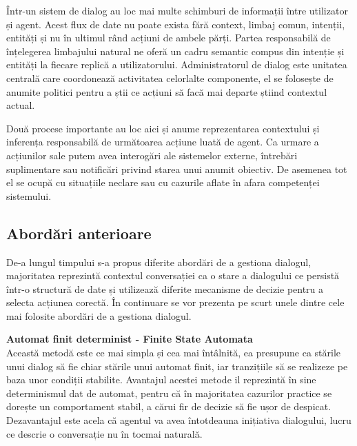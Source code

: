 Într-un sistem de dialog au loc mai multe schimburi de informații între utilizator și agent. Acest flux de date nu poate exista fără context, limbaj comun, intenții, entități și nu în ultimul rând acțiuni de ambele părți. Partea responsabilă de înțelegerea limbajului natural ne oferă un cadru semantic compus din intenție și entități la fiecare replică a utilizatorului. Administratorul de dialog este unitatea centrală care coordonează activitatea celorlalte componente, el se folosește de anumite politici pentru a știi ce acțiuni să facă mai departe știind contextul actual.

Două procese importante au loc aici și anume reprezentarea contextului și inferența responsabilă de următoarea acțiune luată de agent.
Ca urmare a acțiunilor sale putem avea interogări ale sistemelor externe, întrebări suplimentare sau notificări privind starea unui anumit obiectiv.
De asemenea tot el se ocupă cu situațiile neclare sau cu cazurile aflate în afara competenței sistemului.

\subsection{Abordări anterioare}

De-a lungul timpului s-a propus diferite abordări de a gestiona dialogul, majoritatea reprezintă contextul conversației ca o stare a dialogului ce persistă într-o structură de date și utilizează diferite mecanisme de decizie pentru a selecta acțiunea corectă. În continuare se vor prezenta pe scurt unele dintre cele mai folosite abordări de a gestiona dialogul.

\textbf{Automat finit determinist - Finite State Automata}\\
Această metodă este ce mai simpla și cea mai întâlnită, ea presupune ca stările unui dialog să fie chiar stările unui automat finit, iar tranzițiile să se realizeze pe baza unor condiții stabilite. Avantajul acestei metode il reprezintă în sine determinismul dat de automat, pentru că în majoritatea cazurilor practice se dorește un comportament stabil, a cărui fir de decizie să fie ușor de despicat. Dezavantajul este acela că agentul va avea întotdeauna inițiativa dialogului, lucru ce descrie o conversație nu în tocmai naturală.
	
